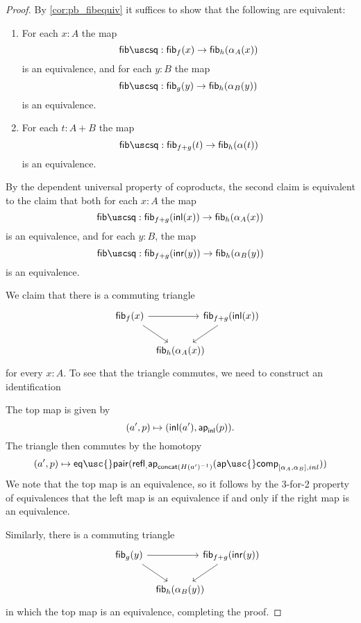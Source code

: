 \begin{proof}
By \cref{cor:pb_fibequiv} it suffices to show that the following are equivalent:
\begin{enumerate}
\item For each $x:A$ the map
\begin{equation*}
\fibsquare:\fib{f}{x}\to\fib{h}{\alpha_A(x)}
\end{equation*}
is an equivalence, and for each $y:B$ the map
\begin{equation*}
\fibsquare:\fib{g}{y}\to\fib{h}{\alpha_B(y)}
\end{equation*}
is an equivalence.
\item For each $t:A+B$ the map
\begin{equation*}
\fibsquare:\fib{f+g}{t} \to \fib{h}{\alpha(t)}
\end{equation*}
is an equivalence.
\end{enumerate}
By the dependent universal property of coproducts, the second claim is equivalent to the claim that both for each $x:A$ the map
\begin{equation*}
\fibsquare:\fib{f+g}{\inl(x)}\to \fib{h}{\alpha_A(x)}
\end{equation*}
is an equivalence, and for each $y:B$, the map
\begin{equation*}
\fibsquare:\fib{f+g}{\inr(y)}\to \fib{h}{\alpha_B(y)} 
\end{equation*}
is an equivalence.

We claim that there is a commuting triangle
\begin{equation*}
\begin{tikzcd}[column sep=-1em]
\fib{f}{x} \arrow[rr] \arrow[dr] & & \fib{f+g}{\inl(x)} \arrow[dl] \\
\phantom{\fib{f+g}{\inl(x)}} & \fib{h}{\alpha_A(x)}
\end{tikzcd}
\end{equation*}
for every $x:A$. To see that the triangle commutes, we need to construct an identification


The top map is given by
\begin{equation*}
(a',p)\mapsto ({\mathsf{inl}}(a'),\mathsf{ap}_{{\mathsf{inl}}}({p})).
\end{equation*}
The triangle then commutes by the homotopy
\begin{equation*}
(a',p)\mapsto \mathsf{eq\usc{}pair}(\refl,\ap{\mathsf{concat}(H(a')^{-1})}{\mathsf{ap\usc{}comp}_{[\alpha_A,\alpha_B],inl}})
\end{equation*}
We note that the top map is an equivalence, so it follows by the 3-for-2 property of equivalences that the left map is an equivalence if and only if the right map is an equivalence. 

Similarly, there is a commuting triangle
\begin{equation*}
\begin{tikzcd}[column sep=-1em]
\fib{g}{y} \arrow[rr] \arrow[dr] & & \fib{f+g}{\inr(y)} \arrow[dl] \\
\phantom{\fib{f+g}{\inr(y)}} & \fib{h}{\alpha_B(y)}
\end{tikzcd}
\end{equation*}
in which the top map is an equivalence, completing the proof.
\end{proof}

